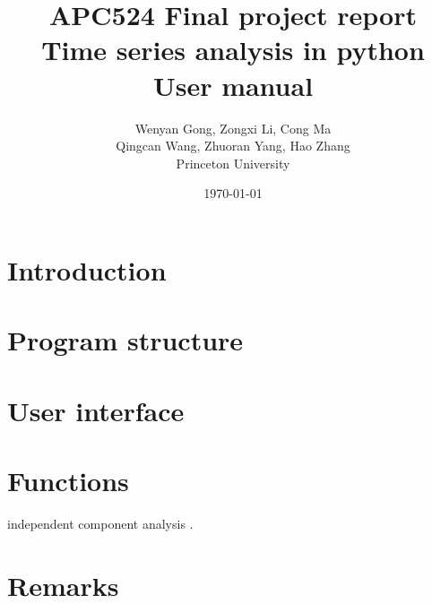 \documentclass[12pt,a4paper]{article}
\title{APC524 Final project report
\\Time series analysis in python
\\User manual}
\author{Wenyan Gong, Zongxi Li, Cong Ma
\\Qingcan Wang, Zhuoran Yang, Hao Zhang
\\Princeton University}
\date{\today}
\begin{document}
\maketitle

\section{Introduction}

\section{Program structure}

\section{User interface}

\section{Functions}

independent component analysis \cite{hyvarinen2000independent}.

\section{Remarks}


\end{document}
